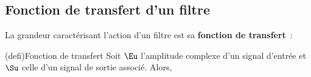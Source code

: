 \documentclass[../../main/main.tex]{subfiles}
\begin{document}
\subsection{Fonction de transfert d'un filtre}

La grandeur caractérisant l'action d'un filtre est sa \textbf{fonction de
	transfert}~:
\begin{tcb*}(defi){Fonction de transfert}
	Soit $\Eu$ l'amplitude complexe d'un signal d'entrée et $\Su$ celle d'un
	signal de sortie associé. Alors,
	\psw{%
		\[
			\Hu(\w) = \frac{\Su(\w)}{\Eu}
			\Lra
			\Su(\w) = \Hu(\w)\Eu
			\Lra
			\left\{
			\begin{array}{ll}
				S(\w)    & = \abs{\Hu(\w)\Eu} = E \cdot \abs{\Hu(\w)}
				\\[1em]
				\f_s(\w) & = \arg*{\Hu(\w)\Eu} = \f_e + \arg*{\Hu(\w)}
			\end{array}
			\right.
		\]
	}%
\end{tcb*}
\end{document}

